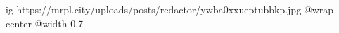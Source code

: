  
 
 
 
 

\ifcmt
  ig https://mrpl.city/uploads/posts/redactor/ywba0xxueptubbkp.jpg
  @wrap center
  @width 0.7
\fi
